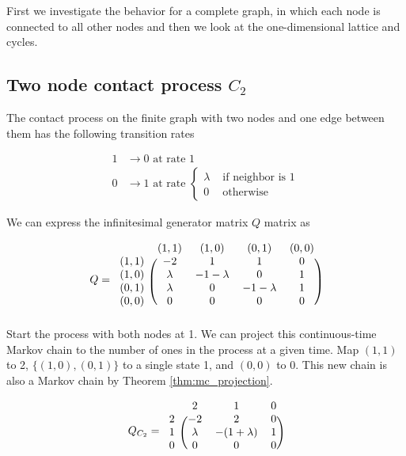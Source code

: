 \documentclass{article}
\theoremstyle{plain}
\theoremstyle{definition}
\theoremstyle{remark}
\numberwithin{equation}{section}
\begin{document}
First we investigate the behavior for a complete graph, in which each node is connected to all other nodes and then we look at the one-dimensional lattice and cycles.


\subsection{Two node contact process \texorpdfstring{$C_2$}{C2}}

The contact process on the finite graph with two nodes and one edge between them has the following transition rates

\begin{align}
    1 &\to 0 \text{ at rate } 1\\
    0 &\to 1 \text{ at rate } \begin{cases}
        \lambda & \text{ if neighbor is 1}\\
        0 & \text{ otherwise}
    \end{cases}
\end{align}

We can express the infinitesimal generator matrix $Q$ matrix as

$$
Q = \begin{blockarray}{ccccc}
    & (1,1) & (1,0) & (0,1) & (0,0)\\
    \begin{block}{c(cccc)}
        (1,1) & -2 & 1 & 1 & 0\\
        (1,0) & \lambda & - 1 - \lambda & 0 & 1\\
        (0,1) & \lambda & 0 & - 1 - \lambda & 1\\
        (0,0) & 0 & 0 & 0 & 0\\
    \end{block}
\end{blockarray}
$$
Start the process with both nodes at 1.
We can project this continuous-time Markov chain to the number of ones in the process at a given time.
Map $(1,1)$ to 2, $\{(1,0),(0,1)\}$ to a single state 1, and $(0,0)$ to 0.
This new chain is also a Markov chain by Theorem \ref{thm:mc_projection}.

\begin{equation}\label{eq:q_c_2}
Q_{C_2} = \begin{blockarray}{cccc}
    & 2 & 1 & 0\\
    \begin{block}{c(ccc)}
        2 & -2 & 2 & 0\\
        1 & \lambda & - (1 + \lambda) & 1\\
        0 & 0 & 0 & 0\\
    \end{block}
\end{blockarray}
\end{equation}
\end{document}
